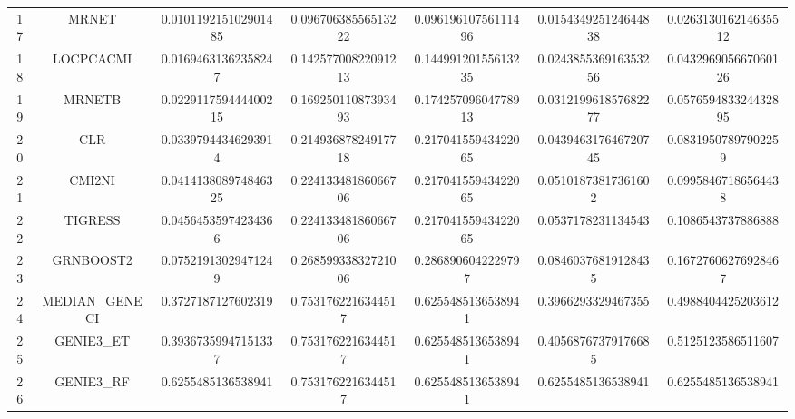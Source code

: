 \documentclass[a4paper,10pt]{article}
\begin{document}
\begin{landscape}
\begin{table}[!htp]
\begin{tabular}{ccccccc}
17&MRNET&0.010119215102901485&0.09670638556513222&0.09619610756111496&0.015434925124644838&0.026313016214635512\\
18&LOCPCACMI&0.01694631362358247&0.14257700822091213&0.14499120155613235&0.024385536916353256&0.043296905667060126\\
19&MRNETB&0.022911759444400215&0.16925011087393493&0.17425709604778913&0.031219961857682277&0.057659483324432895\\
20&CLR&0.03397944346293914&0.21493687824917718&0.21704155943422065&0.043946317646720745&0.08319507897902259\\
21&CMI2NI&0.041413808974846325&0.22413348186066706&0.21704155943422065&0.05101873817361602&0.09958467186564438\\
22&TIGRESS&0.04564535974234366&0.22413348186066706&0.21704155943422065&0.0537178231134543&0.1086543737886888\\
23&GRNBOOST2&0.07521913029471249&0.26859933832721006&0.2868906042229797&0.08460376819128435&0.16727606276928467\\
24&MEDIAN_GENECI&0.3727187127602319&0.7531762216344517&0.6255485136538941&0.3966293329467355&0.4988404425203612\\
25&GENIE3_ET&0.39367359947151337&0.7531762216344517&0.6255485136538941&0.40568767379176685&0.5125123586511607\\
26&GENIE3_RF&0.6255485136538941&0.7531762216344517&0.6255485136538941&0.6255485136538941&0.6255485136538941\\
\hline
\end{tabular}
\end{table}


\newpage


\end{landscape}
\end{document}
